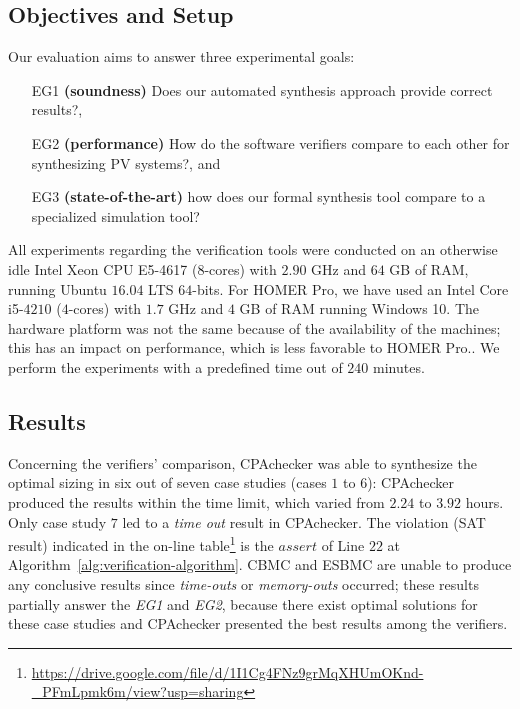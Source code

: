 \documentclass[runningheads]{llncs}
\begin{document}
\subsection{Objectives and Setup}

Our evaluation aims to answer three experimental goals: 
\begin{enumerate}
\item[EG1] \textbf{(soundness)} Does our automated synthesis approach provide correct results?, 
\item[EG2] \textbf{(performance)} How do the software verifiers compare to each other for synthesizing PV systems?, and 
\item[EG3] \textbf{(state-of-the-art)} how does our formal synthesis tool compare to a specialized simulation tool?
\end{enumerate}


All experiments regarding the verification tools were conducted on an otherwise idle Intel Xeon CPU E5-4617 ($8$-cores) with $2.90$ GHz and $64$ GB of RAM, running Ubuntu $16.04$ LTS $64$-bits. For HOMER Pro, we have used an Intel Core i5-$4210$ ($4$-cores) with $1.7$ GHz and $4$ GB of RAM running Windows 10. The hardware platform was not the same because of the availability of the machines; this has an impact on performance, which is less favorable to HOMER Pro.. We perform the experiments with a predefined time out of $240$ minutes.

\subsection{Results}

Concerning the verifiers' comparison, CPAchecker was able to synthesize the optimal sizing in six out of seven case studies (cases $1$ to $6$): CPAchecker produced the results within the time limit, which varied from $2.24$ to $3.92$ hours. Only case study $7$ led to a \textit{time out} result in CPAchecker. The violation (SAT result) indicated in the on-line table\footnote{\url{https://drive.google.com/file/d/1I1Cg4FNz9grMqXHUmOKnd-\_PFmLpmk6m/view?usp=sharing}} is the $assert$ of Line $22$ at Algorithm~\ref{alg:verification-algorithm}. CBMC and ESBMC are unable to produce any conclusive results since \textit{time-outs} or \textit{memory-outs} occurred; these results partially answer the \textit{EG1} and \textit{EG2}, because there exist optimal solutions for these case studies and CPAchecker presented the best results among the verifiers. 
\end{document}
